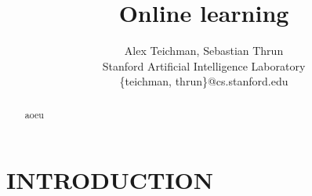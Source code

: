 \documentclass[a4paper, 10pt, conference]{ieeeconf}
\title{\LARGE \bf
Online learning
}
\author{ Alex Teichman, Sebastian Thrun \\
  Stanford Artificial Intelligence Laboratory\\
  \{teichman, thrun\}@cs.stanford.edu
}
\begin{document}
\maketitle
\thispagestyle{empty}
\pagestyle{empty}


\begin{abstract}
aoeu
\end{abstract}


\section{INTRODUCTION}

\cite{Teichman2011b}





\end{document}
